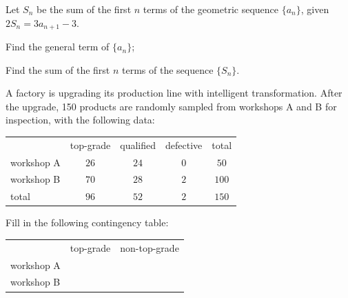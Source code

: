 \documentclass[UTF8,12pt]{ctexart}
\begin{document}
\begin{questions}[start=17]

  \item Let $S_{n}$ be the sum of the first $n$ terms of the geometric sequence
    $\{a_{n}\}$, given $2S_{n}=3a_{n+1}-3$.

    \begin{subquestions}
      \item
      Find the general term of $\{a_{n}\}$;
      \item
      Find the sum of the first $n$ terms of the sequence $\{S_{n}\}$.
    \end{subquestions}

  \item A factory is upgrading its production line with intelligent transformation.
    After the upgrade, 150 products are randomly sampled from workshops A and B for
    inspection, with the following data:

    \begin{center}
      \begin{tabular}{lcccc}
        \toprule
                   & top-grade & qualified & defective & total \\
        workshop A & $26$      & $24$      & $0$       & $50$ \\
        workshop B & $70$      & $28$      & $2$       & $100$ \\
        total      & $96$      & $52$      & $2$       & $150$ \\
        \bottomrule
      \end{tabular}
    \end{center}

    \begin{subquestions}
      \item
      Fill in the following contingency table:

        \begin{center}
          \begin{tabular}{lcc}
            \toprule
                       & top-grade & non-top-grade \\
            workshop A &           &  \\
            workshop B &           &  \\
            \bottomrule
          \end{tabular}
        \end{center}


\end{subquestions}
\end{questions}
\end{document}
